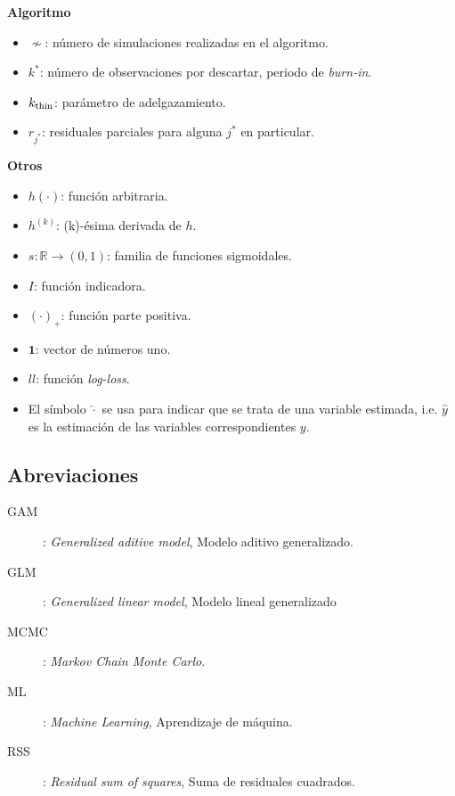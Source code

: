 \documentclass[../../Main/Main.tex]{subfiles}
\begin{document}
\textbf{Algoritmo}
\begin{itemize}[label={}]
	\item $\nsim$: número de simulaciones realizadas en el algoritmo.
	\item $k^*$: número de observaciones por descartar, periodo de \textit{burn-in}. 
	\item $k_{\text{thin}}$: parámetro de adelgazamiento. 
	\item $r_{j^*}$: residuales parciales para alguna $j^*$ en particular. 
\end{itemize}

\textbf{Otros}
\begin{itemize}[label={}]
	\item $h(\cdot)$: función arbitraria. 
	\item $h^{(k)}$: (k)-ésima derivada de $h$. 
	\item $s: \mathbb{R} \rightarrow (0,1)$: familia de funciones sigmoidales. 
	\item $I$: función indicadora. 
	\item $(\cdot)_{+}$: función parte positiva. 
	\item $\mathbf{1}$: vector de números uno.
	\item $ll$: función \textit{log-loss}. 
	\item El símbolo $\hat{\cdot}$ se usa para indicar que se trata de una variable estimada, i.e. $\hat{y}$ es la estimación de las variables correspondientes $y$.
\end{itemize}

\subsection*{Abreviaciones}
\begin{description}
	\item[GAM]: \textit{Generalized aditive model}, Modelo aditivo generalizado. 
	\item[GLM]: \textit{Generalized linear model}, Modelo lineal generalizado
	\item[MCMC]: \textit{Markov Chain Monte Carlo}.
	\item[ML]: \textit{Machine Learning}, Aprendizaje de máquina.
	\item[RSS]: \textit{Residual sum of squares}, Suma de residuales cuadrados.
\end{description}
\end{document}
